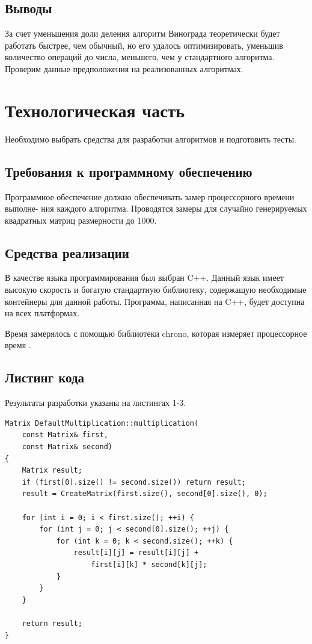 \documentclass[a4paper,12pt]{article}
\begin{document}
\subsection{Выводы}

За счет уменьшения доли деления алгоритм Винограда теоретически будет работать быстрее,
чем обычный, но его удалось оптимизировать, уменьшив количество операций до числа,
меньшего, чем у стандартного алгоритма. Проверим данные предположения на реализованных
алгоритмах.

\newpage
\section{Технологическая часть}

Необходимо выбрать средства для разработки алгоритмов и подготовить тесты.

\subsection{Требования к программному обеспечению}

Программное обеспечение должно обеспечивать замер процессорного времени выполне- ния каждого алгоритма. Проводятся замеры для случайно генерируемых квадратных матриц
размерности до 1000.

\subsection{Средства реализации}

В качестве языка программирования был выбран C++.
Данный язык имеет высокую скорость и богатую стандартную библиотеку,
содержащую необходимые контейнеры для данной работы. Программа, написанная на C++,
будет доступна на всех платформах.

Время замерялось с помощью библиотеки chrono, которая измеряет процессорное время \cite{chrono}.

\subsection{Листинг кода}

Результаты разработки указаны на листингах 1-3.

\begin{lstlisting}[caption=Стандартный алгоритм умножения матриц]
Matrix DefaultMultiplication::multiplication(
    const Matrix& first,
    const Matrix& second)
{
    Matrix result;
    if (first[0].size() != second.size()) return result;
    result = CreateMatrix(first.size(), second[0].size(), 0);

    for (int i = 0; i < first.size(); ++i) {
        for (int j = 0; j < second[0].size(); ++j) {
            for (int k = 0; k < second.size(); ++k) {
                result[i][j] = result[i][j] +
                    first[i][k] * second[k][j];
            }
        }
    }

    return result;
}
\end{lstlisting}
\end{document}
